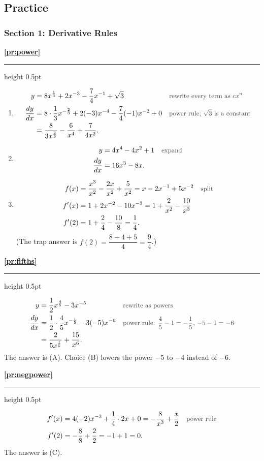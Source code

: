 \documentclass[11pt,a4paper]{article}
\newcommand{\solitem}[2]{%
 \par\addvspace{16pt}\Needspace{10\baselineskip}%
 {\large\bfseries \ref{#1}}\par\nobreak\vspace{2pt}%
 {\color{rulegray}\hrule height 0.5pt}\nobreak\vspace{7pt}%
 #2\par}
\newcommand{\why}[1]{\text{\small\color{darkgray}#1}}
\begin{document}
\subsection*{Practice}
\subsubsection*{Section 1: Derivative Rules}
\solitem{pr:power}{%
\begin{enumerate}[label=(\alph*)]
 \item
 \begin{align*}
 y&=8x^{\frac13}+2x^{-3}-\frac74x^{-1}+\sqrt3 &&\why{rewrite every term as $cx^n$}\\
 \frac{dy}{dx}&=8\cdot\frac13x^{-\frac23}+2(-3)x^{-4}-\frac74(-1)x^{-2}+0 &&\why{power rule; $\sqrt3$ is a constant}\\
 &=\frac{8}{3x^{\frac23}}-\frac{6}{x^4}+\frac{7}{4x^2}.
 \end{align*}
 \item
 \begin{align*}
 y&=4x^4-4x^2+1 &&\why{expand}\\
 \frac{dy}{dx}&=16x^3-8x.
 \end{align*}
 \item
 \begin{align*}
 f(x)&=\frac{x^3}{x^2}-\frac{2x}{x^2}+\frac{5}{x^2}=x-2x^{-1}+5x^{-2} &&\why{split}\\
 f'(x)&=1+2x^{-2}-10x^{-3}=1+\frac{2}{x^2}-\frac{10}{x^3}\\
 f'(2)&=1+\frac24-\frac{10}{8}=\frac14.
 \end{align*}
 (The trap answer is $f(2)=\dfrac{8-4+5}{4}=\dfrac94$.)
\end{enumerate}
}

\solitem{pr:fifths}{%
\begin{align*}
y&=\frac12x^{\frac45}-3x^{-5} &&\why{rewrite as powers}\\
\frac{dy}{dx}&=\frac12\cdot\frac45x^{-\frac15}-3(-5)x^{-6} &&\why{power rule: $\dfrac45-1=-\dfrac15$, $-5-1=-6$}\\
&=\frac{2}{5x^{\frac15}}+\frac{15}{x^6}.
\end{align*}
The answer is (A). Choice (B) lowers the power $-5$ to $-4$ instead of $-6$.
}

\solitem{pr:negpower}{%
\begin{align*}
f'(x)&=4(-2)x^{-3}+\frac14\cdot2x+0=-\frac{8}{x^3}+\frac x2 &&\why{power rule}\\
f'(2)&=-\frac88+\frac22=-1+1=0.
\end{align*}
The answer is (C).
}
\end{document}

